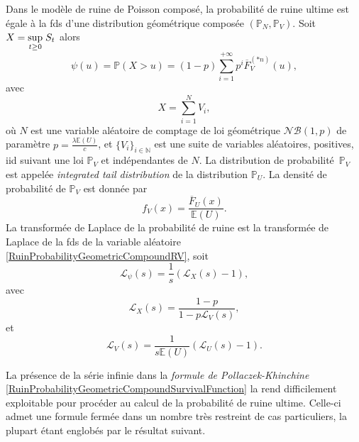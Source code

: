 \begin{Theo}\label{PollaczeckKhinchineTheo}
Dans le modèle de ruine de Poisson composé, la probabilité de ruine ultime est égale à la \gls{fds} d'une distribution géométrique composée $(\mathbb{P}_{N},\mathbb{P}_{V})$. Soit $X=\underset{t\geq0}{\sup}\hspace{0.1cm}S_{t}$ alors
\begin{equation}\label{RuinProbabilityGeometricCompoundSurvivalFunction}
\psi(u)=\mathbb{P}(X>u)=(1-p)\sum_{i=1}^{+\infty}p^{i}\overline{F}_{V}^{(*n)}(u),
\end{equation}
avec
\begin{equation}\label{RuinProbabilityGeometricCompoundRV}
X=\sum_{i=1}^{N}V_{i},
\end{equation}
où $N$ est une variable aléatoire de comptage de loi géométrique $\mathcal{NB}(1,p)$ de paramètre $p=\frac{\lambda \mathbb{E}(U)}{c}$, et $\{V_{i}\}_{i\in\mathbb{N}}$ est une suite de variables aléatoires, positives, \gls{iid} suivant une loi $\mathbb{P}_{V}$ et indépendantes de $N$. La distribution de probabilité $\,\mathbb{P}_{V}$ est appelée \textit{integrated tail distribution} de la distribution $\mathbb{P}_{U}$. La densité de probabilité de $\mathbb{P}_{V}$ est donnée par  
\begin{equation}\label{IntegratedTailDistribution}
f_{V}(x)=\frac{\overline{F}_{U}(x)}{\mathbb{E}(U)}.
\end{equation}
La transformée de Laplace de la probabilité de ruine est la transformée de Laplace de la \gls{fds} de la variable aléatoire \eqref{RuinProbabilityGeometricCompoundRV}, soit
\begin{equation}\label{RuinProbabilityLaplaceTransform}
\mathcal{L}_{\psi}(s)=\frac{1}{s}\left(\mathcal{L}_{X}(s)-1\right),
\end{equation}
avec
\begin{equation}\label{LaplaceTransformGeometricCompound}
\mathcal{L}_{X}(s)=\frac{1-p}{1-p\mathcal{L}_{V}(s)},
\end{equation}
et 
\begin{equation}\label{LaplaceTransformIntegratedTailDistribution}
\mathcal{L}_{V}(s)=\frac{1}{s\mathbb{E}(U)}\left(\mathcal{L}_{U}(s)-1\right).
\end{equation}
\end{Theo} 
La présence de la série infinie dans la \textit{formule de Pollaczek-Khinchine} \eqref{RuinProbabilityGeometricCompoundSurvivalFunction} la rend difficilement exploitable pour procéder au calcul de la probabilité de ruine ultime. Celle-ci admet une formule fermée dans un nombre très restreint de cas particuliers, la plupart étant englobés par le résultat suivant. 
